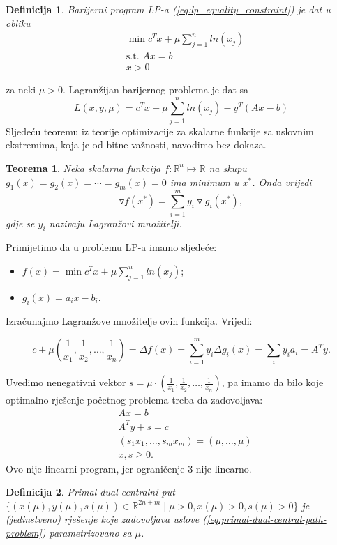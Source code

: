 \documentclass[a4paper, utf8, 11pt, colorlinks]{article}
\newtheorem{definition}{Definicija}
\newtheorem{thm}{Teorema}
\begin{document}
\begin{definition}
	Barijerni program LP-a (\ref{eq:lp_equality_constraint}) je dat u obliku 
	\begin{align*}
		&\min c^T x + \mu \sum_{j=1}^n ln(x_j) \\
		&\mbox{s.t. } A x = b \\
		& x > 0
	\end{align*}
\end{definition}
za neki $\mu >0$. Lagranžijan barijernog problema je dat sa 
$$  L(x, y, \mu) = c^T x - \mu \sum_{j=1}^n ln(x_j)  - y^T(Ax - b) $$
Sljedeću teoremu iz teorije optimizacije  za skalarne funkcije sa uslovnim ekstremima, koja je od bitne važnosti, navodimo   bez dokaza. 
\begin{thm}
	Neka skalarna funkcija  $f:\mathbb{R}^n \mapsto \mathbb{R}$ na skupu $g_1(x)=g_2(x)= \cdots = g_m(x) =0$ ima minimum u $x^*$. Onda vrijedi 
	$$ \triangledown f (x^*) = \sum_{i=1}^m y_i \triangledown g_i(x^*),$$
	gdje se $y_i$ nazivaju Lagranžovi množitelji. 
\end{thm}

Primijetimo da u problemu LP-a imamo sljedeće:
\begin{itemize}
	\item $f(x) = \min c^T x + \mu \sum_{j=1}^n ln(x_j) $;
	\item $g_i(x) = a_i x - b_i$.
\end{itemize}
Izračunajmo Lagranžove množitelje ovih funkcija. Vrijedi:

$$c + \mu (\frac{1}{x_1}, \frac{1}{x_2}, \ldots, \frac{1}{x_n}) = \Delta f (x) =\sum_{i=1}^m y_i \Delta g_i(x) = \sum_{i} y_i a_i = A^T y.$$ 

Uvedimo nenegativni vektor $s =\mu \cdot (\frac{1}{x_1}, \frac{1}{x_2}, \ldots, \frac{1}{x_n})$, pa imamo da bilo koje optimalno rješenje početnog problema treba da zadovoljava:
\begin{align}
	&A x = b \nonumber \\
	&A^T y + s = c  \nonumber \\
	& (s_1 x_1, \ldots, s_m x_m) = (\mu, \ldots, \mu) \label{eq:primal-dual-central-path-problem} \\
	& x, s \geq 0. \nonumber
\end{align}
Ovo nije linearni program, jer ograničenje 3 nije linearno.

\begin{definition}
	Primal-dual centralni put $\{(x(\mu), y(\mu), s(\mu)) \in \mathbb{R}^{2n + m} \mid \mu > 0, x(\mu) >0, s(\mu)>0 \}$ je (jedinstveno) rješenje koje zadovoljava uslove (\ref{eq:primal-dual-central-path-problem}) parametrizovano sa $\mu$. 
\end{definition}
\end{document}
